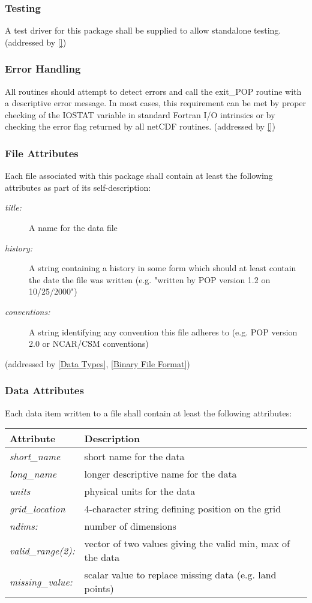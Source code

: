 \documentclass[11pt]{article}
\begin{document}
\subsubsection{Testing}
\label{Testing}
A test driver for this package shall be supplied to allow standalone testing.
(addressed by \ref{})

\subsubsection{Error Handling}
\label{Error Handling}
All routines should attempt to detect errors and call the 
exit\_POP routine with a descriptive error message.  
In most cases, this requirement can be met by proper 
checking of the IOSTAT variable in standard Fortran I/O 
intrinsics or by checking the error flag returned by all netCDF routines.
(addressed by \ref{})

\subsubsection{File Attributes}
\label{File Attributes}
Each file associated with this package shall contain at 
least the following attributes as part of its self-description:

\begin{description}
\item [\textit{title:}] A name for the data file 
\item [\textit{history:}] A string containing a history in some form 
which should at least contain the date the file was 
written (e.g. "written by POP version 1.2 on 10/25/2000") 
\item [\textit{conventions:}] A string identifying any convention 
this file adheres to (e.g. POP version 2.0 or NCAR/CSM conventions) 
\end{description}
(addressed by \ref{Data Types}, \ref{Binary File Format})

\subsubsection{Data Attributes}
\label{Data Attributes}
Each data item written to a file shall contain at least 
the following attributes:

\begin{tabular}{|| l | l ||} \hline \hline
Attribute & Description \\
\hline \hline
 \textit{short\_name}  &  {short name for the data} \\
 \textit{long\_name}   &  {longer descriptive name for the data} \\
 \textit{units}        &  {physical units for the data} \\
 \textit{grid\_location} & {4-character string defining position on the grid} \\
 \textit{ndims:}          & {number of dimensions} \\
 \textit{valid\_range(2):} & {vector of two values giving the 
valid min, max of the data} \\
 \textit{missing\_value:} & {scalar value to replace 
missing data (e.g. land points)} \\
\hline \hline
\end{tabular}
\end{document}
